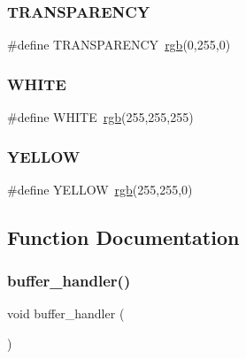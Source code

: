 \subsubsection{\texorpdfstring{T\+R\+A\+N\+S\+P\+A\+R\+E\+N\+CY}{TRANSPARENCY}}
{\footnotesize\ttfamily \#define T\+R\+A\+N\+S\+P\+A\+R\+E\+N\+CY~\hyperlink{group__video__gr_gafcc897567998ed3a26974926501a4abd}{rgb}(0,255,0)}

\hypertarget{group__video__gr_ga87b537f5fa5c109d3c05c13d6b18f382}{}\label{group__video__gr_ga87b537f5fa5c109d3c05c13d6b18f382} 
\subsubsection{\texorpdfstring{W\+H\+I\+TE}{WHITE}}
{\footnotesize\ttfamily \#define W\+H\+I\+TE~\hyperlink{group__video__gr_gafcc897567998ed3a26974926501a4abd}{rgb}(255,255,255)}

\hypertarget{group__video__gr_gabf681265909adf3d3e8116c93c0ba179}{}\label{group__video__gr_gabf681265909adf3d3e8116c93c0ba179} 
\subsubsection{\texorpdfstring{Y\+E\+L\+L\+OW}{YELLOW}}
{\footnotesize\ttfamily \#define Y\+E\+L\+L\+OW~\hyperlink{group__video__gr_gafcc897567998ed3a26974926501a4abd}{rgb}(255,255,0)}



\subsection{Function Documentation}
\hypertarget{group__video__gr_ga1cf21cb9ef69ad19a5de13ff77a8c798}{}\label{group__video__gr_ga1cf21cb9ef69ad19a5de13ff77a8c798} 
\subsubsection{\texorpdfstring{buffer\+\_\+handler()}{buffer\_handler()}}
{\footnotesize\ttfamily void buffer\+\_\+handler (\begin{DoxyParamCaption}{ }\end{DoxyParamCaption})}



